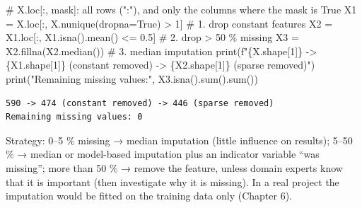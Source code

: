 \documentclass[
  letterpaper,
  DIV=11,
  numbers=noendperiod]{scrreprt}
\newenvironment{Shaded}{\begin{snugshade}}{\end{snugshade}}
\newcommand{\BuiltInTok}[1]{\textcolor[rgb]{0.00,0.23,0.31}{#1}}
\newcommand{\CommentTok}[1]{\textcolor[rgb]{0.37,0.37,0.37}{#1}}
\newcommand{\DecValTok}[1]{\textcolor[rgb]{0.68,0.00,0.00}{#1}}
\newcommand{\FloatTok}[1]{\textcolor[rgb]{0.68,0.00,0.00}{#1}}
\newcommand{\NormalTok}[1]{\textcolor[rgb]{0.00,0.23,0.31}{#1}}
\newcommand{\OperatorTok}[1]{\textcolor[rgb]{0.37,0.37,0.37}{#1}}
\newcommand{\SpecialCharTok}[1]{\textcolor[rgb]{0.37,0.37,0.37}{#1}}
\newcommand{\SpecialStringTok}[1]{\textcolor[rgb]{0.13,0.47,0.30}{#1}}
\newcommand{\StringTok}[1]{\textcolor[rgb]{0.13,0.47,0.30}{#1}}
\newcommand{\VariableTok}[1]{\textcolor[rgb]{0.07,0.07,0.07}{#1}}
\begin{document}
\begin{tcolorbox}[enhanced jigsaw, left=2mm, title=\textcolor{quarto-callout-caution-color}{\faFire}\hspace{0.5em}{Solution to Exercise 6}, opacityback=0, breakable, rightrule=.15mm, arc=.35mm, toptitle=1mm, colbacktitle=quarto-callout-caution-color!10!white, opacitybacktitle=0.6, coltitle=black, colframe=quarto-callout-caution-color-frame, bottomrule=.15mm, leftrule=.75mm, bottomtitle=1mm, titlerule=0mm, toprule=.15mm, colback=white]

\begin{Shaded}
\begin{Highlighting}[]
\CommentTok{\# X.loc[:, mask]: all rows (":"), and only the columns where the mask is True}
\NormalTok{X1 }\OperatorTok{=}\NormalTok{ X.loc[:, X.nunique(dropna}\OperatorTok{=}\VariableTok{True}\NormalTok{) }\OperatorTok{\textgreater{}} \DecValTok{1}\NormalTok{]              }\CommentTok{\# 1. drop constant features}
\NormalTok{X2 }\OperatorTok{=}\NormalTok{ X1.loc[:, X1.isna().mean() }\OperatorTok{\textless{}=} \FloatTok{0.5}\NormalTok{]                }\CommentTok{\# 2. drop \textgreater{} 50 \% missing}
\NormalTok{X3 }\OperatorTok{=}\NormalTok{ X2.fillna(X2.median())                            }\CommentTok{\# 3. median imputation}
\BuiltInTok{print}\NormalTok{(}\SpecialStringTok{f"}\SpecialCharTok{\{}\NormalTok{X}\SpecialCharTok{.}\NormalTok{shape[}\DecValTok{1}\NormalTok{]}\SpecialCharTok{\}}\SpecialStringTok{ {-}\textgreater{} }\SpecialCharTok{\{}\NormalTok{X1}\SpecialCharTok{.}\NormalTok{shape[}\DecValTok{1}\NormalTok{]}\SpecialCharTok{\}}\SpecialStringTok{ (constant removed) {-}\textgreater{} }\SpecialCharTok{\{}\NormalTok{X2}\SpecialCharTok{.}\NormalTok{shape[}\DecValTok{1}\NormalTok{]}\SpecialCharTok{\}}\SpecialStringTok{ (sparse removed)"}\NormalTok{)}
\BuiltInTok{print}\NormalTok{(}\StringTok{"Remaining missing values:"}\NormalTok{, X3.isna().}\BuiltInTok{sum}\NormalTok{().}\BuiltInTok{sum}\NormalTok{())}
\end{Highlighting}
\end{Shaded}

\begin{verbatim}
590 -> 474 (constant removed) -> 446 (sparse removed)
Remaining missing values: 0
\end{verbatim}

Strategy: 0--5 \% missing → median imputation (little influence on
results); 5--50 \% → median or model-based imputation plus an indicator
variable ``was missing''; more than 50 \% → remove the feature, unless
domain experts know that it is important (then investigate why it is
missing). In a real project the imputation would be fitted on the
training data only (Chapter 6).

\end{tcolorbox}
\end{document}
